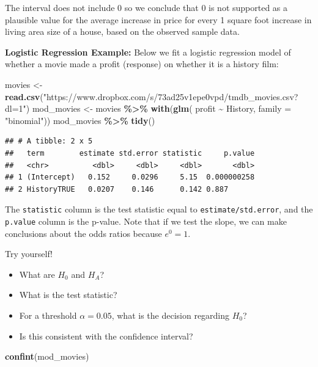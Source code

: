 \documentclass[
]{book}
\newenvironment{Shaded}{\begin{snugshade}}{\end{snugshade}}
\newcommand{\AttributeTok}[1]{\textcolor[rgb]{0.13,0.29,0.53}{#1}}
\newcommand{\FunctionTok}[1]{\textcolor[rgb]{0.13,0.29,0.53}{\textbf{#1}}}
\newcommand{\NormalTok}[1]{#1}
\newcommand{\OtherTok}[1]{\textcolor[rgb]{0.56,0.35,0.01}{#1}}
\newcommand{\SpecialCharTok}[1]{\textcolor[rgb]{0.81,0.36,0.00}{\textbf{#1}}}
\newcommand{\StringTok}[1]{\textcolor[rgb]{0.31,0.60,0.02}{#1}}
\providecommand{\tightlist}{%
  \setlength{\itemsep}{0pt}\setlength{\parskip}{0pt}}
\begin{document}
The interval does not include 0 so we conclude that 0 is not supported as a plausible value for the average increase in price for every 1 square foot increase in living area size of a house, based on the observed sample data.

\textbf{Logistic Regression Example:} Below we fit a logistic regression model of whether a movie made a profit (response) on whether it is a history film:

\begin{Shaded}
\begin{Highlighting}[]
\NormalTok{movies }\OtherTok{\textless{}{-}} \FunctionTok{read.csv}\NormalTok{(}\StringTok{"https://www.dropbox.com/s/73ad25v1epe0vpd/tmdb\_movies.csv?dl=1"}\NormalTok{)}
\NormalTok{mod\_movies }\OtherTok{\textless{}{-}}\NormalTok{ movies }\SpecialCharTok{\%\textgreater{}\%}
  \FunctionTok{with}\NormalTok{(}\FunctionTok{glm}\NormalTok{( profit }\SpecialCharTok{\textasciitilde{}}\NormalTok{ History, }\AttributeTok{family =} \StringTok{"binomial"}\NormalTok{))}
\NormalTok{mod\_movies }\SpecialCharTok{\%\textgreater{}\%}
  \FunctionTok{tidy}\NormalTok{()}
\end{Highlighting}
\end{Shaded}

\begin{verbatim}
## # A tibble: 2 x 5
##   term        estimate std.error statistic     p.value
##   <chr>          <dbl>     <dbl>     <dbl>       <dbl>
## 1 (Intercept)   0.152     0.0296     5.15  0.000000258
## 2 HistoryTRUE   0.0207    0.146      0.142 0.887
\end{verbatim}

The \texttt{statistic} column is the test statistic equal to \texttt{estimate/std.error}, and the \texttt{p.value} column is the p-value. Note that if we test the slope, we can make conclusions about the odds ratios because \(e^0 = 1\).

Try yourself!

\begin{itemize}
\tightlist
\item
  What are \(H_0\) and \(H_A\)?
\item
  What is the test statistic?
\item
  For a threshold \(\alpha = 0.05\), what is the decision regarding \(H_0\)?
\item
  Is this consistent with the confidence interval?
\end{itemize}

\begin{Shaded}
\begin{Highlighting}[]
\FunctionTok{confint}\NormalTok{(mod\_movies)}
\end{Highlighting}
\end{Shaded}
\end{document}
